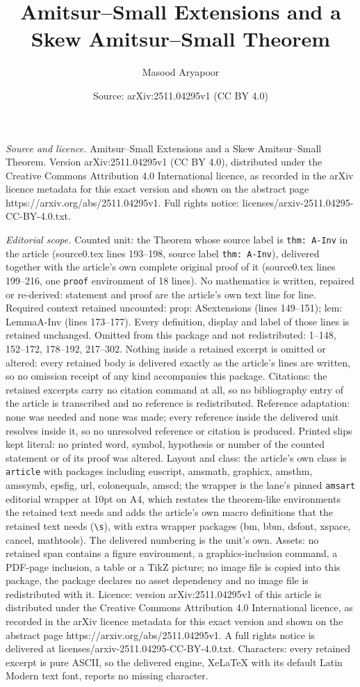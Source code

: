 \documentclass[10pt,a4paper]{amsart}
\title[Amitsur--Small Extensions and a Skew Amitsur--Small Theorem]{Amitsur--Small Extensions and a Skew Amitsur--Small Theorem}
\author{Masood Aryapoor}
\date{Source: arXiv:2511.04295v1 (CC BY 4.0)}
\begin{document}
\maketitle

\noindent\emph{Source and licence.} Amitsur--Small Extensions and a Skew Amitsur--Small Theorem. Version arXiv:2511.04295v1 (CC BY 4.0), distributed under the Creative Commons Attribution 4.0 International licence, as recorded in the arXiv licence metadata for this exact version and shown on the abstract page https://arxiv.org/abs/2511.04295v1. Full rights notice: licenses/arxiv-2511.04295-CC-BY-4.0.txt.\par\smallskip

\noindent\textit{Editorial scope.} Counted unit: the Theorem whose source label is \texttt{thm: A-Inv} in the article (source0.tex lines 193--198, source label \texttt{thm: A-Inv}), delivered together with the article's own complete original proof of it (source0.tex lines 199--216, one \texttt{proof} environment of 18 lines). No mathematics is written, repaired or re-derived: statement and proof are the article's own text line for line. Required context retained uncounted: prop: ASextensions (lines 149--151); lem: LemmaA-Inv (lines 173--177). Every definition, display and label of those lines is retained unchanged. Omitted from this package and not redistributed: 1--148, 152--172, 178--192, 217--302. Nothing inside a retained excerpt is omitted or altered: every retained body is delivered exactly as the article's lines are written, so no omission receipt of any kind accompanies this package. Citations: the retained excerpts carry no citation command at all, so no bibliography entry of the article is transcribed and no reference is redistributed. Reference adaptation: none was needed and none was made; every reference inside the delivered unit resolves inside it, so no unresolved reference or citation is produced. Printed slips kept literal: no printed word, symbol, hypothesis or number of the counted statement or of its proof was altered. Layout and class: the article's own class is \texttt{article} with packages including euscript, amsmath, graphicx, amsthm, amssymb, epsfig, url, colonequals, amscd; the wrapper is the lane's pinned \texttt{amsart} editorial wrapper at 10pt on A4, which restates the theorem-like environments the retained text needs and adds the article's own macro definitions that the retained text needs (\texttt{\textbackslash s}), with extra wrapper packages (bm, bbm, dsfont, xspace, cancel, mathtools). The delivered numbering is the unit's own. Assets: no retained span contains a figure environment, a graphics-inclusion command, a PDF-page inclusion, a table or a TikZ picture; no image file is copied into this package, the package declares no asset dependency and no image file is redistributed with it. Licence: version arXiv:2511.04295v1 of this article is distributed under the Creative Commons Attribution 4.0 International licence, as recorded in the arXiv licence metadata for this exact version and shown on the abstract page https://arxiv.org/abs/2511.04295v1. A full rights notice is delivered at licenses/arxiv-2511.04295-CC-BY-4.0.txt. Characters: every retained excerpt is pure ASCII, so the delivered engine, XeLaTeX with its default Latin Modern text font, reports no missing character.
\end{document}
